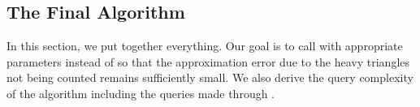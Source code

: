 








\subsection{The Final Algorithm}
\label{ssec:final-algo}
In this section, we put together everything.  Our goal is to call \heavyoracle{} with appropriate parameters  instead of \exactheavyoracle{} so that the approximation error due to the heavy triangles not being counted remains sufficiently small. We also derive the query complexity of the algorithm including the queries made through \heavyoracle{}.



